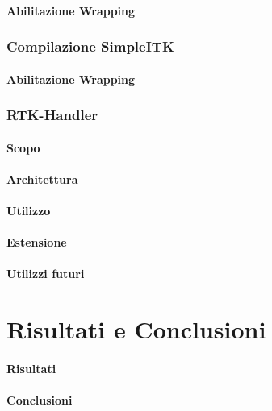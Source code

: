 \documentclass[a4paper,11pt, oneside]{article}
\begin{document}
            \subsection{Abilitazione Wrapping}
        \section{Compilazione SimpleITK}
            \subsection{Abilitazione Wrapping}
        \section{RTK-Handler}
            \subsection{Scopo}
            \subsection{Architettura}
            \subsection{Utilizzo}
            \subsection{Estensione}
            \subsection{Utilizzi futuri}
            
    \part{Risultati e Conclusioni}
        \subsection{Risultati}
        \subsection{Conclusioni}
\end{document}

